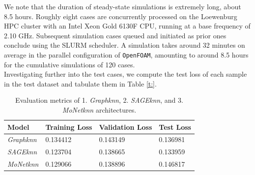 We note that the duration of steady-state simulations is extremely long, about 8.5 hours. Roughly eight cases are concurrently processed on the Loewenburg HPC cluster with an Intel Xeon Gold 6130F \gls{CPU}, running at a base frequency of 2.10 GHz. Subsequent simulation cases queued and initiated as prior ones conclude using the \gls{SLURM} scheduler. A simulation takes around 32 minutes on average in the parallel configuration of \verb |OpenFOAM|, amounting to around 8.5 hours for the cumulative simulations of 120 cases.\\
Investigating further into the test cases, we compute the test loss of each sample in the test dataset and tabulate them in Table \ref{t:}.
\begin{table}[ht]
    \centering
    \caption{Evaluation metrics of  1. \textit{Graphknn}, 2. \textit{SAGEknn}, and 3. \textit{MoNetknn} architectures. } 
    \label{t:predloss}
    \begin{tabular}{|l|l|l|l|}
    \hline
    \textbf{Model} & \textbf{Training Loss} & \textbf{Validation Loss} & \textbf{Test Loss}\\
    \hline
     \textit{Graphknn} & 0.134412& 0.143149 & 0.136981   \\
    \hline
    \textit{SAGEknn}& 0.123704 & 0.138665 & 0.133959 \\
    \hline
    \textit{MoNetknn} & 0.129066  & 0.138896 & 0.146817  \\
    \hline
    \end{tabular}
\end{table}
